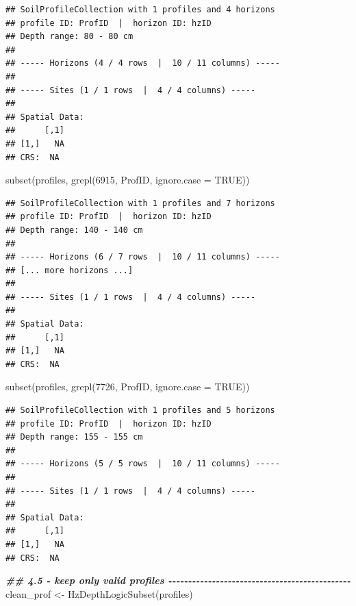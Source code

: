 \documentclass[
  10pt,
  b5paper,
  oneside]{book}
\newenvironment{Shaded}{\begin{snugshade}}{\end{snugshade}}
\newcommand{\AttributeTok}[1]{\textcolor[rgb]{0.77,0.63,0.00}{#1}}
\newcommand{\ConstantTok}[1]{\textcolor[rgb]{0.00,0.00,0.00}{#1}}
\newcommand{\DecValTok}[1]{\textcolor[rgb]{0.00,0.00,0.81}{#1}}
\newcommand{\DocumentationTok}[1]{\textcolor[rgb]{0.56,0.35,0.01}{\textbf{\textit{#1}}}}
\newcommand{\FunctionTok}[1]{\textcolor[rgb]{0.00,0.00,0.00}{#1}}
\newcommand{\NormalTok}[1]{#1}
\newcommand{\OtherTok}[1]{\textcolor[rgb]{0.56,0.35,0.01}{#1}}
\begin{document}
\begin{verbatim}
## SoilProfileCollection with 1 profiles and 4 horizons
## profile ID: ProfID  |  horizon ID: hzID 
## Depth range: 80 - 80 cm
## 
## ----- Horizons (4 / 4 rows  |  10 / 11 columns) -----
## 
## ----- Sites (1 / 1 rows  |  4 / 4 columns) -----
## 
## Spatial Data:
##      [,1]
## [1,]   NA
## CRS:  NA
\end{verbatim}

\begin{Shaded}
\begin{Highlighting}[]
\FunctionTok{subset}\NormalTok{(profiles, }\FunctionTok{grepl}\NormalTok{(}\DecValTok{6915}\NormalTok{, ProfID, }\AttributeTok{ignore.case =} \ConstantTok{TRUE}\NormalTok{))}
\end{Highlighting}
\end{Shaded}

\begin{verbatim}
## SoilProfileCollection with 1 profiles and 7 horizons
## profile ID: ProfID  |  horizon ID: hzID 
## Depth range: 140 - 140 cm
## 
## ----- Horizons (6 / 7 rows  |  10 / 11 columns) -----
## [... more horizons ...]
## 
## ----- Sites (1 / 1 rows  |  4 / 4 columns) -----
## 
## Spatial Data:
##      [,1]
## [1,]   NA
## CRS:  NA
\end{verbatim}

\begin{Shaded}
\begin{Highlighting}[]
\FunctionTok{subset}\NormalTok{(profiles, }\FunctionTok{grepl}\NormalTok{(}\DecValTok{7726}\NormalTok{, ProfID, }\AttributeTok{ignore.case =} \ConstantTok{TRUE}\NormalTok{))}
\end{Highlighting}
\end{Shaded}

\begin{verbatim}
## SoilProfileCollection with 1 profiles and 5 horizons
## profile ID: ProfID  |  horizon ID: hzID 
## Depth range: 155 - 155 cm
## 
## ----- Horizons (5 / 5 rows  |  10 / 11 columns) -----
## 
## ----- Sites (1 / 1 rows  |  4 / 4 columns) -----
## 
## Spatial Data:
##      [,1]
## [1,]   NA
## CRS:  NA
\end{verbatim}

\begin{Shaded}
\begin{Highlighting}[]
\DocumentationTok{\#\# 4.5 {-} keep only valid profiles {-}{-}{-}{-}{-}{-}{-}{-}{-}{-}{-}{-}{-}{-}{-}{-}{-}{-}{-}{-}{-}{-}{-}{-}{-}{-}{-}{-}{-}{-}{-}{-}{-}{-}{-}{-}{-}{-}{-}{-}{-}{-}{-}{-}{-}{-}}
\NormalTok{clean\_prof }\OtherTok{\textless{}{-}} \FunctionTok{HzDepthLogicSubset}\NormalTok{(profiles)}
\end{Highlighting}
\end{Shaded}
\end{document}
